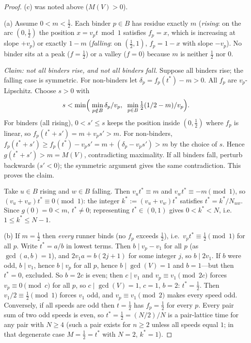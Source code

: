 \begin{proof}
(c) was noted above ($M(V)>0$).

(a) Assume $0<m<\tfrac12$. Each binder $p\in B$ has residue exactly $m$
(\emph{rising}: on the arc $(0,\tfrac12)$ the position $x=v_p t\bmod 1$
satisfies $f_p=x$, which is increasing at slope $+v_p$) or exactly $1-m$
(\emph{falling}: on $(\tfrac12,1)$, $f_p=1-x$ with slope $-v_p$). No
binder sits at a peak ($f=\tfrac12$) or a valley ($f=0$) because $m$ is
neither $\tfrac12$ nor $0$.

\emph{Claim: not all binders rise, and not all binders fall.} Suppose all
binders rise; the falling case is symmetric. For non-binders let
$\delta_p=f_p(t^\ast)-m>0$. All $f_p$ are $v_p$-Lipschitz. Choose
$s>0$ with
\[
s<\min\Bigl(\;\min_{p\notin B}\delta_p/v_p,\;\;
                \min_{p\in B}\tfrac{1}{2}(1/2-m)/v_p\Bigr).
\]
For binders (all rising), $0<s'\le s$ keeps the position inside
$(0,\tfrac12)$ where $f_p$ is linear, so
$f_p(t^\ast+s')=m+v_p s'>m$. For non-binders,
$f_p(t^\ast+s')\ge f_p(t^\ast)-v_p s'=m+(\delta_p-v_p s')>m$ by the
choice of $s$. Hence $g(t^\ast+s')>m=M(V)$, contradicting maximality. If
all binders fall, perturb backwards ($s'<0$); the symmetric argument gives
the same contradiction. This proves the claim.

Take $u\in B$ rising and $w\in B$ falling. Then
$v_u t^\ast\equiv m$ and $v_w t^\ast\equiv -m \pmod 1$, so
$(v_u+v_w)t^\ast\equiv 0 \pmod 1$: the integer
$k^\ast:=(v_u+v_w)t^\ast$ satisfies $t^\ast=k^\ast/N_{uw}$. Since
$g(0)=0<m$, $t^\ast\ne 0$; representing $t^\ast\in(0,1)$ gives
$0<k^\ast<N$, i.e.\ $1\le k^\ast\le N-1$.

(b) If $m=\tfrac12$ then \emph{every} runner binds (no $f_p$ exceeds
$\tfrac12$), i.e.\ $v_p t^\ast\equiv \tfrac12 \pmod 1$ for all $p$. Write
$t^\ast=a/b$ in lowest terms. Then $b\mid v_p-v_1$ for all $p$ (as
$\gcd(a,b)=1$), and $2v_1 a=b(2j+1)$ for some integer $j$, so $b\mid
2v_1$. If $b$ were odd, $b\mid v_1$, hence $b\mid v_p$ for all $p$, hence
$b\mid\gcd(V)=1$ and $b=1$---but then $t^\ast=0$, excluded. So $b=2c$ is
even; then $c\mid v_1$ and $v_p\equiv v_1\pmod{2c}$ forces
$v_p\equiv 0\pmod c$ for all $p$, so $c\mid\gcd(V)=1$, $c=1$, $b=2$:
$t^\ast=\tfrac12$. Then $v_1/2\equiv\tfrac12\pmod 1$ forces $v_1$ odd,
and $v_p\equiv v_1\pmod 2$ makes every speed odd. Conversely, if all
speeds are odd then $t=\tfrac12$ has $f_p=\tfrac12$ for every $p$. Every
pair sum of two odd speeds is even, so $t^\ast=\tfrac12=(N/2)/N$ is a
pair-lattice time for any pair with $N\ge 4$ (such a pair exists for
$n\ge2$ unless all speeds equal $1$; in that degenerate case
$M=\tfrac12=t^\ast$ with $N=2$, $k^\ast=1$).
\end{proof}

